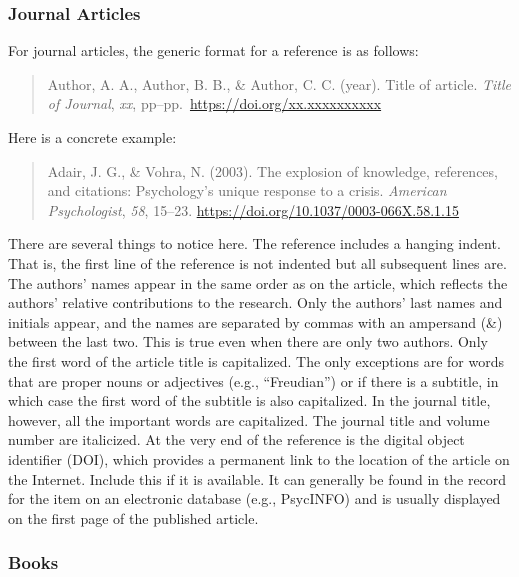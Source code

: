 \documentclass[
]{krantz}
\begin{document}
\hypertarget{journal-articles}{%
\subsubsection*{Journal Articles}\label{journal-articles}}


For journal articles, the generic format for a reference is as follows:

\begin{quote}
Author, A. A., Author, B. B., \& Author, C. C. (year). Title of article. \emph{Title of Journal}, \emph{xx}, pp--pp.~\url{https://doi.org/xx.xxxxxxxxxx}
\end{quote}

Here is a concrete example:

\begin{quote}
Adair, J. G., \& Vohra, N. (2003). The explosion of knowledge, references, and citations: Psychology's unique response to a crisis. \emph{American Psychologist}, \emph{58}, 15--23. \url{https://doi.org/10.1037/0003-066X.58.1.15}
\end{quote}

There are several things to notice here. The reference includes a hanging indent. That is, the first line of the reference is not indented but all subsequent lines are. The authors' names appear in the same order as on the article, which reflects the authors' relative contributions to the research. Only the authors' last names and initials appear, and the names are separated by commas with an ampersand (\&) between the last two. This is true even when there are only two authors. Only the first word of the article title is capitalized. The only exceptions are for words that are proper nouns or adjectives (e.g., ``Freudian'') or if there is a subtitle, in which case the first word of the subtitle is also capitalized. In the journal title, however, all the important words are capitalized. The journal title and volume number are italicized. At the very end of the reference is the digital object identifier (DOI), which provides a permanent link to the location of the article on the Internet. Include this if it is available. It can generally be found in the record for the item on an electronic database (e.g., PsycINFO) and is usually displayed on the first page of the published article.

\hypertarget{books}{%
\subsubsection*{Books}\label{books}}
\end{document}
